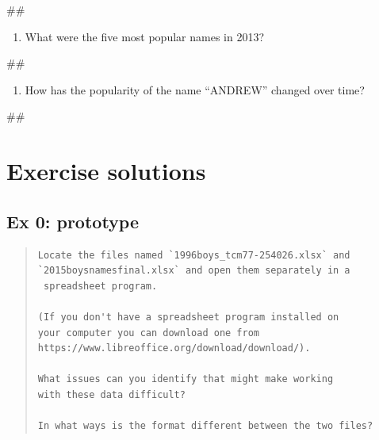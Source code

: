 \documentclass[]{book}
\newenvironment{Shaded}{\begin{snugshade}}{\end{snugshade}}
\newcommand{\NormalTok}[1]{#1}
\providecommand{\tightlist}{%
  \setlength{\itemsep}{0pt}\setlength{\parskip}{0pt}}
\begin{document}
\begin{Shaded}
\begin{Highlighting}[]
\NormalTok{## }
\end{Highlighting}
\end{Shaded}

\begin{enumerate}
\def\labelenumi{\arabic{enumi}.}
\setcounter{enumi}{2}
\tightlist
\item
  What were the five most popular names in 2013?
\end{enumerate}

\begin{Shaded}
\begin{Highlighting}[]
\NormalTok{## }
\end{Highlighting}
\end{Shaded}

\begin{enumerate}
\def\labelenumi{\arabic{enumi}.}
\setcounter{enumi}{3}
\tightlist
\item
  How has the popularity of the name ``ANDREW'' changed over time?
\end{enumerate}

\begin{Shaded}
\begin{Highlighting}[]
\NormalTok{## }
\end{Highlighting}
\end{Shaded}

\section{Exercise solutions}\label{exercise-solutions-3}

\subsection{Ex 0: prototype}\label{ex-0-prototype-3}

\begin{quote}
\begin{verbatim}
Locate the files named `1996boys_tcm77-254026.xlsx` and 
`2015boysnamesfinal.xlsx` and open them separately in a 
 spreadsheet program. 

(If you don't have a spreadsheet program installed on
your computer you can download one from
https://www.libreoffice.org/download/download/). 

What issues can you identify that might make working
with these data difficult?

In what ways is the format different between the two files?
\end{verbatim}
\end{quote}
\end{document}
